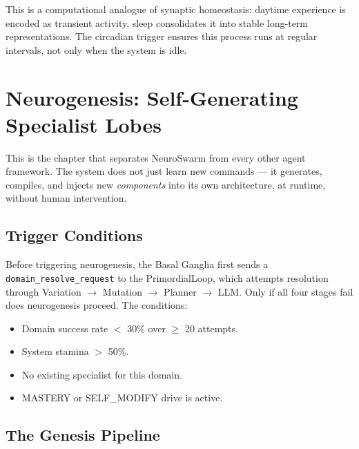 \documentclass[12pt,a4paper]{report}
\begin{document}
This is a computational analogue of synaptic homeostasis: daytime experience is encoded as transient activity, sleep consolidates it into stable long-term representations. The circadian trigger ensures this process runs at regular intervals, not only when the system is idle.

\chapter{Neurogenesis: Self-Generating Specialist Lobes}

This is the chapter that separates NeuroSwarm from every other agent framework. The system does not just learn new commands --- it generates, compiles, and injects new \emph{components} into its own architecture, at runtime, without human intervention.

\section{Trigger Conditions}
Before triggering neurogenesis, the Basal Ganglia first sends a \texttt{domain\_resolve\_request} to the PrimordialLoop, which attempts resolution through Variation $\to$ Mutation $\to$ Planner $\to$ LLM. Only if all four stages fail does neurogenesis proceed. The conditions:

\begin{itemize}
    \item Domain success rate $<$ 30\% over $\geq$ 20 attempts.
    \item System stamina $>$ 50\%.
    \item No existing specialist for this domain.
    \item MASTERY or SELF\_MODIFY drive is active.
\end{itemize}

\section{The Genesis Pipeline}
\end{document}
